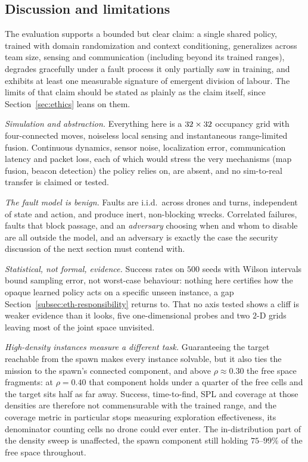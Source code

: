 \subsection{Discussion and limitations}
\label{subsec:exp-discussion}

The evaluation supports a bounded but clear claim: a single shared policy,
trained with domain randomization and context conditioning, generalizes across
team size, sensing and communication (including beyond its trained ranges),
degrades gracefully under a fault process it only partially saw in training, and
exhibits at least one measurable signature of emergent division of labour. The
limits of that claim should be stated as plainly as the claim itself, since
Section~\ref{sec:ethics} leans on them.

\emph{Simulation and abstraction.} Everything here is a $32\times
32$ occupancy grid with four-connected moves, noiseless local sensing and
instantaneous range-limited fusion. Continuous dynamics, sensor noise,
localization error, communication latency and packet loss, each of which would
stress the very mechanisms (map fusion, beacon detection) the policy relies on,
are absent, and no sim-to-real transfer is claimed or tested.

\emph{The fault model is benign.} Faults are i.i.d.\ across drones and turns,
independent of state and action, and produce inert, non-blocking wrecks.
Correlated failures, faults that block passage, and an \emph{adversary} choosing
when and whom to disable are all outside the model, and an adversary is exactly
the case the security discussion of the next section must contend with.

\emph{Statistical, not formal, evidence.} Success rates on $500$ seeds with
Wilson intervals bound sampling error, not worst-case behaviour: nothing here
certifies how the opaque learned policy acts on a specific unseen instance, a gap
Section~\ref{subsec:eth-responsibility} returns to. That no axis tested shows a
cliff is weaker evidence than it looks, five one-dimensional probes and two
$2$-D grids leaving most of the joint space unvisited.

\emph{High-density instances measure a different task.} Guaranteeing the target
reachable from the spawn makes every instance solvable, but it also ties the
mission to the spawn's connected component, and above $\rho \approx 0.30$ the
free space fragments: at $\rho = 0.40$ that component holds under a quarter of
the free cells and the target sits half as far away. Success, time-to-find, SPL
and coverage at those densities are therefore not commensurable with the trained
range, and the coverage metric in particular stops measuring exploration
effectiveness, its denominator counting cells no drone could ever enter. The
in-distribution part of the density sweep is unaffected, the spawn component
still holding $75\text{--}99\%$ of the free space throughout.

